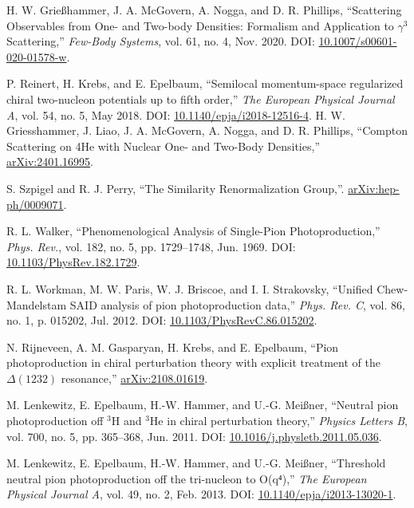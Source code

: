 \documentclass[a4paper,11pt]{article}
\begin{document}
\begin{thebibliography}{99}
  H. W. Grie{\ss}hammer, J. A. McGovern, A. Nogga, and D. R.
  Phillips, ``Scattering Observables from One- and Two-body
  Densities: Formalism and Application to $\gamma^3$ Scattering,''
  \textit{Few-Body Systems}, vol. 61, no. 4, Nov. 2020. DOI:
  \href{https://doi.org/10.1007/s00601-020-01578-w}{10.1007/s00601-020-01578-w}.

  P. Reinert, H. Krebs, and E. Epelbaum, ``Semilocal momentum-space
  regularized chiral two-nucleon potentials up to fifth order,''
  \textit{The European Physical Journal A}, vol. 54, no. 5, May 2018.
  DOI:
  \href{http://dx.doi.org/10.1140/epja/i2018-12516-4}{10.1140/epja/i2018-12516-4}.
  H. W. Griesshammer, J. Liao, J. A. McGovern, A. Nogga, and D. R.
  Phillips, ``Compton Scattering on 4He with Nuclear One- and
  Two-Body Densities,''
  \href{https://arxiv.org/abs/2401.16995}{arXiv:2401.16995}.

  S. Szpigel and R. J. Perry, ``The Similarity Renormalization
  Group,''.
  \href{https://arxiv.org/abs/hep-ph/0009071}{arXiv:hep-ph/0009071}.

  R. L. Walker, ``Phenomenological Analysis of Single-Pion
  Photoproduction,'' \textit{Phys. Rev.}, vol. 182, no. 5, pp.
  1729--1748, Jun. 1969. DOI:
  \href{https://link.aps.org/doi/10.1103/PhysRev.182.1729}{10.1103/PhysRev.182.1729}.

  R. L. Workman, M. W. Paris, W. J. Briscoe, and I. I. Strakovsky,
  ``Unified Chew-Mandelstam SAID analysis of pion photoproduction
  data,'' \textit{Phys. Rev. C}, vol. 86, no. 1, p. 015202, Jul.
  2012. DOI:
  \href{https://link.aps.org/doi/10.1103/PhysRevC.86.015202}{10.1103/PhysRevC.86.015202}.

N. Rijneveen, A. M. Gasparyan, H. Krebs, and E. Epelbaum, ``Pion photoproduction in chiral perturbation theory with explicit treatment of the $\Delta(1232)$ resonance,''  \href{https://arxiv.org/abs/2108.01619}{arXiv:2108.01619}.

M. Lenkewitz, E. Epelbaum, H.-W. Hammer, and U.-G. Meißner, ``Neutral pion photoproduction off $^3$H and $^3$He in chiral perturbation theory,'' \textit{Physics Letters B}, vol. 700, no. 5, pp. 365–368, Jun. 2011. DOI: \href{http://dx.doi.org/10.1016/j.physletb.2011.05.036}{10.1016/j.physletb.2011.05.036}.

M. Lenkewitz, E. Epelbaum, H.-W. Hammer, and U.-G. Meißner, ``Threshold neutral pion photoproduction off the tri-nucleon to O(q⁴),'' \textit{The European Physical Journal A}, vol. 49, no. 2, Feb. 2013. DOI: \href{http://dx.doi.org/10.1140/epja/i2013-13020-1}{10.1140/epja/i2013-13020-1}.
\end{thebibliography}
\end{document}
